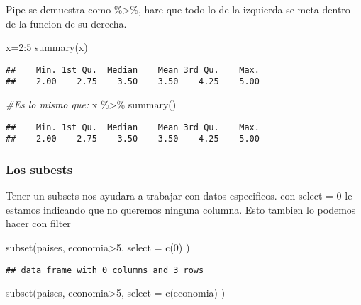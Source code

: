 \documentclass[
]{article}
\newenvironment{Shaded}{\begin{snugshade}}{\end{snugshade}}
\newcommand{\AttributeTok}[1]{\textcolor[rgb]{0.77,0.63,0.00}{#1}}
\newcommand{\CommentTok}[1]{\textcolor[rgb]{0.56,0.35,0.01}{\textit{#1}}}
\newcommand{\DecValTok}[1]{\textcolor[rgb]{0.00,0.00,0.81}{#1}}
\newcommand{\FunctionTok}[1]{\textcolor[rgb]{0.00,0.00,0.00}{#1}}
\newcommand{\NormalTok}[1]{#1}
\newcommand{\OtherTok}[1]{\textcolor[rgb]{0.56,0.35,0.01}{#1}}
\newcommand{\SpecialCharTok}[1]{\textcolor[rgb]{0.00,0.00,0.00}{#1}}
\begin{document}
Pipe se demuestra como \%\textgreater\%, hare que todo lo de la
izquierda se meta dentro de la funcion de su derecha.

\begin{Shaded}
\begin{Highlighting}[]
\NormalTok{x}\OtherTok{=}\DecValTok{2}\SpecialCharTok{:}\DecValTok{5}
\FunctionTok{summary}\NormalTok{(x)}
\end{Highlighting}
\end{Shaded}

\begin{verbatim}
##    Min. 1st Qu.  Median    Mean 3rd Qu.    Max. 
##    2.00    2.75    3.50    3.50    4.25    5.00
\end{verbatim}

\begin{Shaded}
\begin{Highlighting}[]
\CommentTok{\#Es lo mismo que:}
\NormalTok{x }\SpecialCharTok{\%\textgreater{}\%} \FunctionTok{summary}\NormalTok{()}
\end{Highlighting}
\end{Shaded}

\begin{verbatim}
##    Min. 1st Qu.  Median    Mean 3rd Qu.    Max. 
##    2.00    2.75    3.50    3.50    4.25    5.00
\end{verbatim}

\hypertarget{los-subests}{%
\subsubsection{Los subests}\label{los-subests}}

Tener un subsets nos ayudara a trabajar con datos especificos. con
select = 0 le estamos indicando que no queremos ninguna columna. Esto
tambien lo podemos hacer con filter

\begin{Shaded}
\begin{Highlighting}[]
\FunctionTok{subset}\NormalTok{(paises, economia}\SpecialCharTok{\textgreater{}}\DecValTok{5}\NormalTok{, }\AttributeTok{select =} \FunctionTok{c}\NormalTok{(}\DecValTok{0}\NormalTok{) )}
\end{Highlighting}
\end{Shaded}

\begin{verbatim}
## data frame with 0 columns and 3 rows
\end{verbatim}

\begin{Shaded}
\begin{Highlighting}[]
\FunctionTok{subset}\NormalTok{(paises, economia}\SpecialCharTok{\textgreater{}}\DecValTok{5}\NormalTok{, }\AttributeTok{select =} \FunctionTok{c}\NormalTok{(economia) )}
\end{Highlighting}
\end{Shaded}
\end{document}
